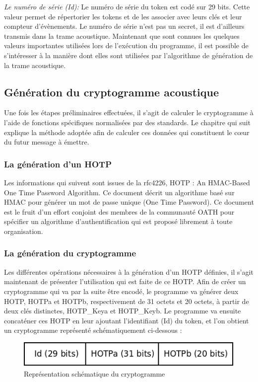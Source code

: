 \textsl{Le numéro de série (Id):}
Le numéro de série du token est codé sur 29 bits. Cette valeur permet de répertorier les tokens et de les associer avec leurs clés et leur compteur d’évènements. Le numéro de série n’est pas un secret, il est d’ailleurs transmis dans la trame acoustique. Maintenant que sont connues les quelques valeurs importantes utilisées lors de l’exécution du programme, il est possible de s’intéresser à la manière dont elles sont utilisées par l’algorithme de génération de la trame acoustique.


\subsection{Génération du cryptogramme acoustique}
Une fois les étapes préliminaires effectuées, il s’agit de calculer le cryptogramme à l’aide de fonctions spécifiques normalisées par des standards. Le chapitre qui suit explique la méthode adoptée afin de calculer ces données qui constituent le cœur du futur message à
émettre.

\subsubsection{La génération d’un HOTP}
Les informations qui suivent sont issues de la rfc4226, HOTP : An
HMAC-Based One Time Password Algorithm. Ce document
décrit un algorithme basé sur HMAC pour générer un mot de passe
unique (One Time Password). Ce document est le fruit d’un effort
conjoint des membres de la communauté OATH pour spécifier un
algorithme d’authentification qui est proposé librement à toute
organisation.

\subsubsection{La génération du cryptogramme}
Les différentes opérations nécessaires à la génération d’un HOTP définies, il s’agit maintenant de présenter l’utilisation qui est faite de ce HOTP. Afin de créer un cryptogramme qui va par la suite être encodé, le programme va générer deux HOTP, HOTPa et HOTPb, respectivement de 31 octets et 20 octets, à partir de deux clés distinctes, HOTP\_Keya et HOTP\_Keyb. Le programme va ensuite concaténer ces HOTP en leur ajoutant l’identifiant (Id) du token, et l’on obtient un cryptogramme représenté schématiquement ci-dessous :

\begin{figure}[!htbp]
  \centering
    \includegraphics[scale=0.5]{images/otp}
  \caption{Représentation schématique du cryptogramme}
\end{figure}

